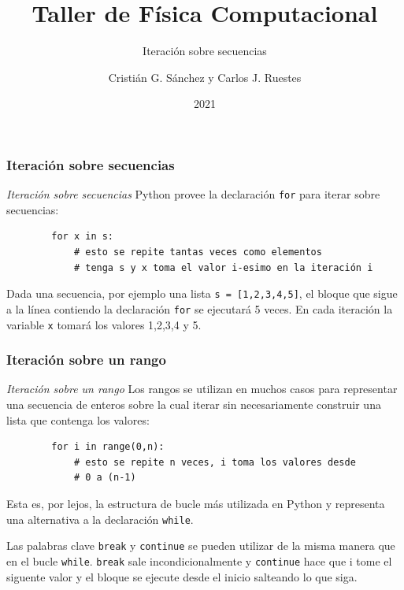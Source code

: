 \documentclass{beamer}
\title{Taller de Física Computacional}
\subtitle{Iteración sobre secuencias}
\author{Cristián G. Sánchez y Carlos J. Ruestes}
\date{2021}
\begin{document}
\frame{\titlepage}

\begin{frame}[fragile]
    \frametitle{Iteración sobre secuencias}
    \begin{block}{{\em Iteración sobre secuencias}}
    Python provee la declaración \texttt{for} para iterar sobre secuencias:
    \begin{verbatim}
        for x in s:
            # esto se repite tantas veces como elementos
            # tenga s y x toma el valor i-esimo en la iteración i
    \end{verbatim}
    Dada una secuencia, por ejemplo una lista \texttt{s = [1,2,3,4,5]}, el bloque que sigue a la línea contiendo la declaración \texttt{for}
    se ejecutará 5 veces. En cada iteración la variable \texttt{x} tomará los valores 1,2,3,4 y 5. 
    \end{block}
\end{frame}

\begin{frame}[fragile]
    \frametitle{Iteración sobre un rango}
    \begin{block}{{\em Iteración sobre un rango}}
    Los rangos se utilizan en muchos casos para representar una secuencia de enteros sobre la cual iterar sin necesariamente construir una lista que contenga los valores:
    \begin{verbatim}
        for i in range(0,n):
            # esto se repite n veces, i toma los valores desde
            # 0 a (n-1)
    \end{verbatim}
    Esta es, por lejos, la estructura de bucle más utilizada en Python y representa una alternativa a la declaración \texttt{while}.
    \end{block}
    Las palabras clave \texttt{break} y \texttt{continue} se pueden utilizar de la misma manera que en el bucle \texttt{while}.
    \texttt{break} sale incondicionalmente y \texttt{continue} hace que i tome el siguente valor y el bloque se ejecute desde el inicio salteando lo
    que siga.
\end{frame}
\end{document}
